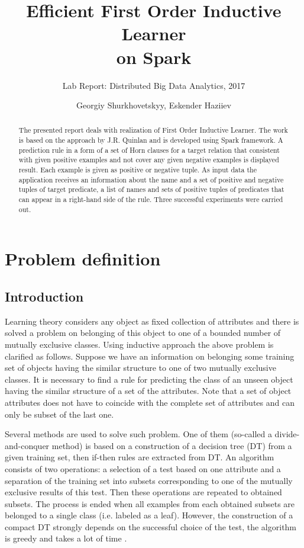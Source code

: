 \documentclass{scrartcl}
\title{Efficient First Order Inductive Learner\\ on Spark}
\subtitle{Lab Report: Distributed Big Data Analytics, 2017}
\date{}
\author{Georgiy Shurkhovetskyy, Eskender Haziiev}
\begin{document}
\maketitle

\begin{abstract}
The presented report deals with realization of First Order Inductive Learner.
The  work is based on the approach by J.R. Quinlan and is developed using Spark  framework.
A prediction rule in a form of a set of Horn clauses for a target relation that consistent
 with given positive examples and not cover any given negative examples is displayed result. Each example is given as positive or negative tuple.
As input data the application receives an information about the name and a set of positive and negative tuples of target predicate,  a list of  names and sets of positive tuples of predicates that can appear in a right-hand side of the rule. Three successful experiments were carried out.
\end{abstract}

\section{Problem definition}

\subsection{Introduction}

Learning theory considers any object as fixed collection of attributes   and there is solved a problem on belonging of this object to one of a bounded number of mutually exclusive classes.
Using inductive approach the above problem is clarified as follows. Suppose we have an information on belonging some training set of objects having the similar structure to one of two mutually exclusive classes. It is necessary to find a rule for predicting the class of an unseen object having the similar structure of a set of the attributes. Note that a set of object attributes does not have to coincide with the complete set of attributes and can only be subset of the last one.

Several methods are used to solve such problem. One of them (so-called a divide-and-conquer method) is based on a construction of a decision tree (DT) from a given training set, then if-then rules are extracted from  DT. An algorithm consists of two operations: a selection of a test based on one attribute and a separation of the training set into subsets  corresponding to one of the mutually exclusive results of this test. Then these operations are repeated to obtained subsets. The process is ended when all examples from each obtained subsets are belonged to a single class (i.e. labeled as a leaf). However, the construction of a compact DT strongly depends on the successful choice of the test, the algorithm is greedy and takes a lot of time \citep{Quinlan1990}.
\end{document}
